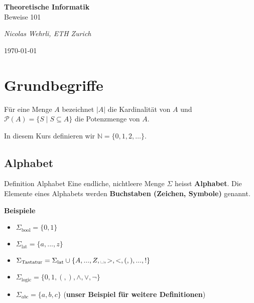 \documentclass[a4paper, 11pt]{article}
\def\N{\mathbb{N}}
\newcommand\myTitle[1]{{\large \textbf {#1}}}
\begin{document}
   \begin{titlepage}
    \begin{center}
        \vspace*{5cm}
        \LARGE \textbf{Theoretische Informatik} \\ Beweise 101
    
        \small\textit{Nicolas Wehrli, ETH Zurich}

        \vspace*{5cm}
        \today
    \end{center}
   
   \end{titlepage}
   \tableofcontents
    \newpage



    \section{Grundbegriffe} %


	Für eine Menge $A$ bezeichnet $|A|$ die Kardinalität von $A$ und $\mathcal{P}(A) = \{S \mid S \subseteq A\}$ die Potenzmenge von $A$.
		
	 In diesem Kurs definieren wir $\N = \{0,1,2, \dots\}$.


\subsection{Alphabet}


		
	 \begin{mainbox}{Definition Alphabet}
		Eine endliche, nichtleere Menge $\Sigma$ heisst \textbf{Alphabet}. Die Elemente eines Alphabets werden \textbf{Buchstaben (Zeichen, Symbole)} genannt.
	 \end{mainbox}
	 
	 \myTitle{Beispiele}
	 \begin{itemize}
		\item $\Sigma_{\text{bool}} = \{0,1\}$
		\item $\Sigma_{\text{lat}} = \{a, ..., z\}$
		\item $\Sigma_{\text{Tastatur}} = \Sigma_{\text{lat}} \cup \{A, ..., Z, \text{\textvisiblespace}, >, <, (,),...,! \}$
		\item $\Sigma_{\text{logic}} = \{0,1,(,),\land, \lor, \lnot\}$
		\item $\Sigma_{abc} = \{a,b,c\}$ (\textbf{unser Beispiel für weitere Definitionen})
	 \end{itemize}
\end{document}
